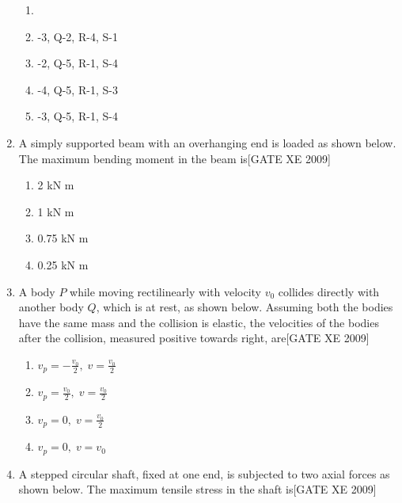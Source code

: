 \documentclass[journal,12pt,onecolumn]{IEEEtran}
\theoremstyle{remark}
\begin{document}
\begin{enumerate}
\begin{enumerate}
    \item 

 \item -3, Q-2, R-4, S-1
 \item -2, Q-5, R-1, S-4
 \item -4, Q-5, R-1, S-3
 \item -3, Q-5, R-1, S-4

\end{enumerate}

\item A simply supported beam with an overhanging end is loaded as shown below. The maximum bending moment in the beam is\hfill[GATE XE 2009]

\begin{multicols}{2}
\begin{enumerate}
    \item 2 kN m
    \item 1 kN m
    \item 0.75 kN m
    \item 0.25 kN m
\end{enumerate}
\end{multicols}



\item A body $ P $ while moving rectilinearly with velocity $ v_0 $ collides directly with another body $ Q $, which is at rest, as shown below. Assuming both the bodies have the same mass and the collision is elastic, the velocities of the bodies after the collision, measured positive towards right, are\hfill[GATE XE 2009]

\begin{multicols}{2}
\begin{enumerate}
    \item $v_p = -\frac{v_0}{2},\; v = \frac{v_0}{2}$
    \item $v_p = \frac{v_0}{2},\; v = \frac{v_0}{2}$
    \item $v_p = 0,\; v = \frac{v_0}{2}$
    \item $v_p = 0,\; v = v_0$
\end{enumerate}
\end{multicols}



\item A stepped circular shaft, fixed at one end, is subjected to two axial forces as shown below. The maximum tensile stress in the shaft is\hfill[GATE XE 2009]


\end{enumerate}
\end{document}

